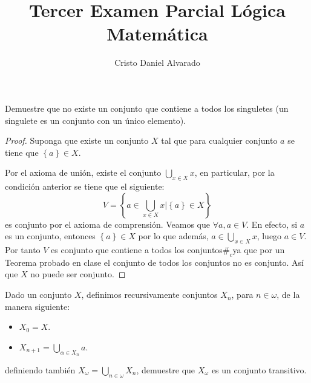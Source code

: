 \documentclass[12pt]{article}
\newcounter{it}
\theoremstyle{largebreak}
\newcommand\contradiction{\ensuremath{\#_c}}
\begin{document}
    \setlength{\parskip}{5pt} %
    \setlength{\parindent}{12pt} %
    \title{Tercer Examen Parcial Lógica Matemática}
    \author{Cristo Daniel Alvarado}
    \maketitle

    \begin{excer}
        Demuestre que no existe un conjunto que contiene a todos los singuletes (un singulete es un conjunto con un único elemento).
    \end{excer}

    \begin{proof}
        Suponga que existe un conjunto $X$ tal que para cualquier conjunto $a$ se tiene que $\left\{a\right\}\in X$.

        Por el axioma de unión, existe el conjunto $\bigcup_{ x\in X}x$, en particular, por la condición anterior se tiene que el siguiente:
        \begin{equation*}
            V=\left\{a\in\bigcup_{ x\in X}x\Big|\left\{a\right\}\in X  \right\}
        \end{equation*}
        es conjunto por el axioma de comprensión. Veamos que $\forall a, a\in V$. En efecto, si $a$ es un conjunto, entonces $\left\{a\right\}\in X$ por lo que además, $a\in\bigcup_{ x\in X}x$, luego $a\in V$. Por tanto $V$ es conjunto que contiene a todos los conjuntos\contradiction ya que por un Teorema probado en clase el conjunto de todos los conjuntos no es conjunto. Así que $X$ no puede ser conjunto. 
    \end{proof}
    
    \begin{excer}
        Dado un conjunto $X$, definimos recursivamente conjuntos $X_n$, para $n\in\omega$, de la manera siguiente:
        \begin{itemize}
            \item $X_0=X$.
            \item $X_{ n+1}=\bigcup_{\alpha\in X_n}a$.
        \end{itemize}
        definiendo también $X_{\omega}=\bigcup_{ n\in\omega}X_n$, demuestre que $X_\omega$ es un conjunto transitivo.
    \end{excer}
\end{document}
